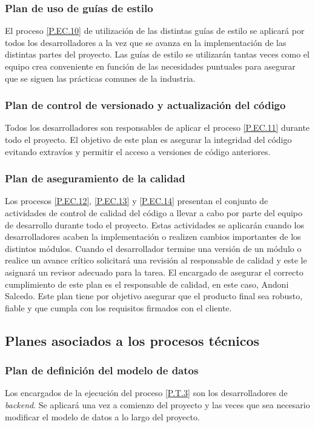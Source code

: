 \documentclass{article}
\begin{document}
\subsubsection{Plan de uso de guías de estilo} \label{PL.EC.8}
El proceso \ref{P.EC.10} de utilización de las distintas guías de estilo se aplicará por todos los desarrolladores a la vez que se avanza en la implementación de las distintas partes del proyecto. Las guías de estilo se utilizarán tantas veces como el equipo crea conveniente en función de las necesidades puntuales para asegurar que se siguen las prácticas comunes de la industria.

\subsubsection{Plan de control de versionado y actualización del código} \label{PL.EC.9}

Todos los desarrolladores son responsables de aplicar el proceso \ref{P.EC.11} durante todo el proyecto. El objetivo de este plan es asegurar la integridad del código evitando extravíos y permitir el acceso a versiones de código anteriores.

\subsubsection{Plan de aseguramiento de la calidad} \label{PL.EC.10}

Los procesos \ref{P.EC.12}, \ref{P.EC.13} y \ref{P.EC.14} presentan el conjunto de actividades de control de calidad del código a llevar a cabo por parte del equipo de desarrollo durante todo el proyecto. Estas actividades se aplicarán cuando los desarrolladores acaben la implementación o realizen cambios importantes de los distintos módulos. Cuando el desarrollador termine una versión de un módulo o realice un avance crítico solicitará una revisión al responsable de calidad y este le asignará un revisor adecuado para la tarea.
El encargado de asegurar el correcto cumplimiento de este plan es el responsable de calidad, en este caso, Andoni Salcedo. Este plan tiene por objetivo asegurar que el producto final sea robusto, fiable y que cumpla con los requisitos firmados con el cliente.

\subsection{Planes asociados a los procesos técnicos}

\subsubsection{Plan de definición del modelo de datos} \label{PL.T.1}
Los encargados de la ejecución del proceso \ref{P.T.3} son los desarrolladores de \textit{backend}. Se aplicará una vez a comienzo del proyecto y las veces que sea necesario modificar el modelo de datos a lo largo del proyecto.
\end{document}
